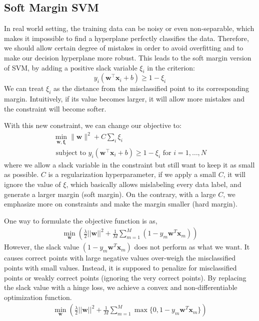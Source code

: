 \documentclass[11pt]{article}
\begin{document}
\normalfont
\subsection{Soft Margin SVM}
In real world setting, the training data can be noisy or even non-separable, which makes it impossible to find a hyperplane perfectly classifies the data. Therefore, we should allow certain degree of mistakes in order to avoid overfitting and to make our decision hyperplane more robust. This leads to the soft margin version of SVM, by adding a positive slack variable $\xi_{i}$ in the criterion: 
\begin{equation}
y_{i}\left(\boldsymbol{w}^{\top} \boldsymbol{x}_{i}+b\right) \geq 1-\xi_{i}
\end{equation}
We can treat $\xi_{i}$ as the distance from the misclassified point to its corresponding margin. Intuitively, if its value becomes larger, it will allow more mistakes and the constraint will become softer.

With this new constraint, we can change our objective to:
\begin{equation}
\begin{array}{c}
\min\limits_{\boldsymbol{w}, \boldsymbol{\xi}}\|\boldsymbol{w}\|^{2}+C \sum_{i} \xi_{i} \\
\text{ subject to } y_{i}\left(\boldsymbol{w}^{\top} \boldsymbol{x}_{i}+b\right) \geq 1-\xi_{i}
\text{ for }i=1, \ldots, N
\end{array}
\end{equation}
where we allow a slack variable in the constraint but still want to keep it as small as possible. $C$ is a regularization hyperparameter, if we apply a small $C$, it will ignore the value of $\xi$, which basically allows mislabeling every data label, and generate a larger margin (soft margin). On the contrary, with a large $C$, we emphasize more on constraints and make the margin smaller (hard margin). 

One way to formulate the objective function is as,
\begin{align}
\min_\mathbf{w} \left(\frac{\lambda}{2}||\mathbf{w}||^2 + \frac{1}{M} \sum_{m=1}^{M} (1 - y_m\mathbf{w}^T\mathbf{x}_m) \right)
\end{align}
However, the slack value $(1 - y_m\mathbf{w}^T\mathbf{x}_m)$ does not perform as what we want. It causes correct points with large negative values over-weigh the misclassified points with small values. Instead, it is supposed to penalize for misclassified points or weakly correct points (ignoring the very correct points). 
By replacing the slack value with a hinge loss, we achieve a convex and non-differentiable optimization function.
\begin{align}
\min_\mathbf{w} \left(\frac{\lambda}{2}||\mathbf{w}||^2 + \frac{1}{M} \sum_{m=1}^{M} \max \{0,1 - y_m\mathbf{w}^T\mathbf{x}_m\} \right)
\end{align}
\end{document}
